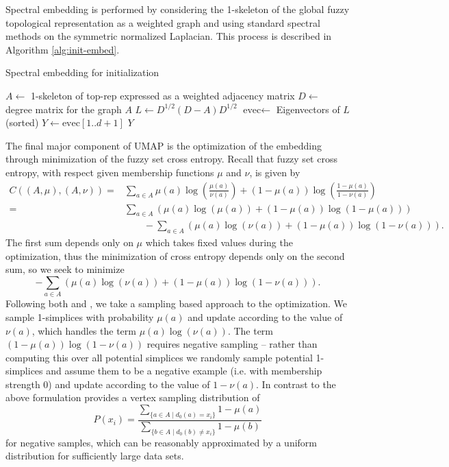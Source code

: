 \documentclass[12pt]{article}
\begin{document}
Spectral embedding is performed by considering the 1-skeleton of the global fuzzy topological representation as a weighted graph and using standard spectral methods on the symmetric normalized Laplacian. This process is described in Algorithm \ref{alg:init-embed}.

\begin{algorithm}[!htbp]
\caption{Spectral embedding for initialization}\label{alg:init-embed}
\begin{algorithmic}[0]
\setlength\baselineskip{18pt}
    \State $A \gets$ 1-skeleton of top-rep expressed as a weighted adjacency matrix
    \State $D \gets$ degree matrix for the graph $A$
    \State $L \gets D^{1/2}(D - A)D^{1/2}$
    \State $\text{evec} \gets$ Eigenvectors of $L$ (sorted)
    \State $Y \gets \text{evec}[1..d+1]$ 
    \State \Return $Y$
\EndFunction\vskip9pt
\end{algorithmic}
\end{algorithm}

The final major component of UMAP is the optimization of the embedding through minimization of the fuzzy set cross entropy. Recall that fuzzy set cross entropy, with respect given membership functions $\mu$ and $\nu$, is given by
\begin{equation}
    \begin{split}
        C((A, \mu), (A, \nu)) = & \sum_{a\in A} \mu(a)\log\left(\frac{\mu(a)}{\nu(a)}\right)
                      + (1 - \mu(a))\log\left(\frac{1 - \mu(a)}{1 - \nu(a)}\right)\\
        = & \sum_{a\in A} \left(\mu(a)\log(\mu(a)) + (1 - \mu(a))\log(1 - \mu(a))\right)\\
          & \qquad - \sum_{a\in A} \left(\mu(a)\log(\nu(a)) + (1 - \mu(a))\log(1 - \nu(a))\right).
    \end{split}
\end{equation}
The first sum depends only on $\mu$ which takes fixed values during the optimization, thus the minimization of cross entropy depends only on the second sum, so we seek to minimize
\[
- \sum_{a\in A} \left(\mu(a)\log(\nu(a)) + (1 - \mu(a))\log(1 - \nu(a))\right).
\]
Following both \cite{tang2016visualizing} and \cite{mikolov2013distributed}, we take a sampling based approach to the optimization. We sample 1-simplices with probability $\mu(a)$ and update according to the value of $\nu(a)$, which handles the term $\mu(a)\log(\nu(a))$. The term $(1 - \mu(a))\log(1 - \nu(a))$ requires negative sampling -- rather than computing this over all potential simplices we randomly sample potential 1-simplices and assume them to be a negative example (i.e. with membership strength 0) and update according to the value of $1 - \nu(a)$. In contrast to \cite{tang2016visualizing} the above formulation provides a vertex sampling distribution of
\[
P(x_i) = \frac{\sum_{\{a\in A\mid d_0(a) = x_i \}} 1 - \mu(a)}{\sum_{\{b\in A\mid d_0(b) \neq x_i\}} 1 - \mu(b)}
\]
for negative samples, which can be reasonably approximated by a uniform distribution for sufficiently large data sets.
\end{document}
